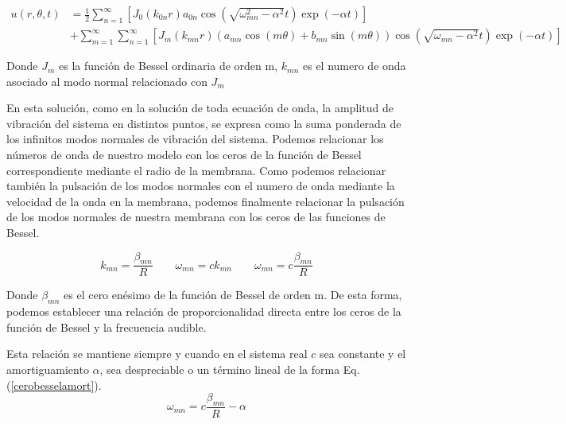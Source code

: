 \documentclass[journal, a4paper,onecolumn]{IEEEtran}
\newcommand{\equationref}[1]{Eq.(\ref{#1})}
\begin{document}
\begin{equation}
\begin{aligned}
u(r, \theta, t) &=\frac{1}{2} \sum_{n=1}^{\infty}\left[J_{0}\left(k_{0 n} r\right) a_{0 n} \cos \left(\sqrt{\omega_{m n}^{2}-\alpha^{2}} t\right) \exp (-\alpha t)\right] \\
& +\sum_{m=1}^{\infty} \sum_{n=1}^{\infty}\left[J_{m}\left(k_{m n} r \right)\left(a_{m n} \cos (m \theta)+b_{m n} \sin (m \theta)\right) \cos \left(\sqrt{\omega_{m n}-\alpha^{2}} t\right) \exp (-\alpha t)\right]
\end{aligned}
\label{solucion_ecuacion}
\end{equation}\newline 

Donde $J_m$ es la función de Bessel ordinaria de orden m, $k_{mn}$ es el numero de onda asociado al modo normal relacionado con $J_m$ \newline

En esta solución, como en la solución de toda ecuación de onda, la amplitud de vibración del sistema en distintos puntos, se expresa como la suma ponderada de los infinitos modos normales de vibración del sistema. Podemos relacionar los números de onda de nuestro modelo con los ceros de la función de Bessel correspondiente mediante el radio de la membrana. Como podemos relacionar también la pulsación de los modos normales con el numero de onda mediante la velocidad de la onda en la membrana, podemos finalmente relacionar la pulsación de los modos normales de nuestra membrana con los ceros de las funciones de Bessel.\newline

\begin{equation}
  k_{mn}=\frac{\beta _{mn}}{R} \qquad \omega_{mn}=c k_{mn} \qquad \omega_{mn}= c\frac{\beta _{mn}}{R}\label{cerobessel}
\end{equation}\newline

Donde $\beta_{mn}$ es el cero enésimo de la función de Bessel de orden m. De esta forma, podemos establecer una relación de proporcionalidad directa entre los ceros de la función de Bessel y la frecuencia audible. \newline 

Esta relación se mantiene siempre y cuando en el sistema real $c$ sea constante y el amortiguamiento $\alpha$,  sea despreciable o un término lineal de la forma \equationref{cerobesselamort}.\newline
\begin{equation}
\omega _{mn} = c \frac{\beta_{mn}}{R} - \alpha 
    \label{cerobesselamort}
\end{equation}
\end{document}
